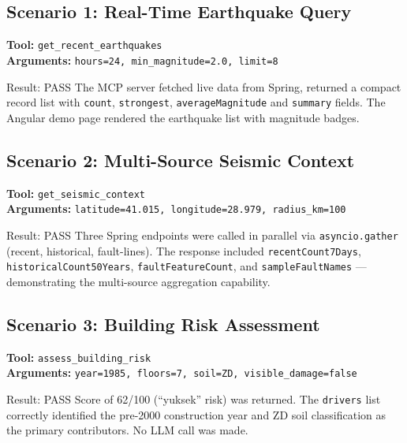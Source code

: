 \documentclass[11pt,a4paper]{article}
\begin{document}
\subsection{Scenario 1: Real-Time Earthquake Query}

\textbf{Tool:} \texttt{get\_recent\_earthquakes}\\
\textbf{Arguments:} \texttt{hours=24, min\_magnitude=2.0, limit=8}

\begin{successbox}{Result: PASS}
The MCP server fetched live data from Spring, returned a compact record list with
\texttt{count}, \texttt{strongest}, \texttt{averageMagnitude} and
\texttt{summary} fields. The Angular demo page rendered the earthquake list with
magnitude badges.
\end{successbox}

\subsection{Scenario 2: Multi-Source Seismic Context}

\textbf{Tool:} \texttt{get\_seismic\_context}\\
\textbf{Arguments:} \texttt{latitude=41.015, longitude=28.979, radius\_km=100}

\begin{successbox}{Result: PASS}
Three Spring endpoints were called in parallel via \texttt{asyncio.gather}
(recent, historical, fault-lines). The response included \texttt{recentCount7Days},
\texttt{historicalCount50Years}, \texttt{faultFeatureCount}, and
\texttt{sampleFaultNames} --- demonstrating the multi-source aggregation capability.
\end{successbox}

\subsection{Scenario 3: Building Risk Assessment}

\textbf{Tool:} \texttt{assess\_building\_risk}\\
\textbf{Arguments:} \texttt{year=1985, floors=7, soil=ZD, visible\_damage=false}

\begin{successbox}{Result: PASS}
Score of 62/100 (``yuksek'' risk) was returned. The \texttt{drivers} list
correctly identified the pre-2000 construction year and ZD soil classification
as the primary contributors. No LLM call was made.
\end{successbox}
\end{document}
